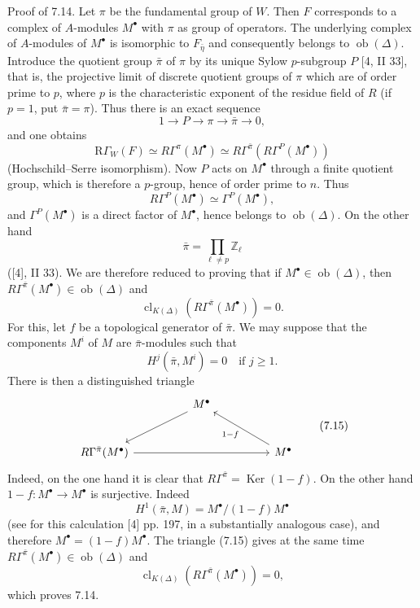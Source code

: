 \documentclass[11pt]{article}
\providecommand{\Ker}{\operatorname{Ker}}
\providecommand{\Ob}{\operatorname{ob}}
\providecommand{\Ker}{\operatorname{Ker}}
\providecommand{\Ker}{\operatorname{Ker}}
\providecommand{\Ob}{\operatorname{ob}}
\providecommand{\Ob}{\operatorname{Ob}}
\providecommand{\clK}[1]{\operatorname{cl}_{K(#1)}}
\providecommand{\RG}{\mathrm R\Gamma}
\providecommand{\Ob}{\operatorname{ob}}
\providecommand{\Ob}{\operatorname{Ob}}
\begin{document}
Proof of 7.14. Let $\pi$ be the fundamental group of $W$. Then $F$ corresponds to a complex of $A$-modules $M^\bullet$ with $\pi$ as group of operators. The underlying complex of $A$-modules of $M^\bullet$ is isomorphic to $F_{\bar\eta}$ and consequently belongs to $\Ob(\Delta)$. Introduce the quotient group $\bar\pi$ of $\pi$ by its unique Sylow $p$-subgroup $P$ [4, II 33], that is, the projective limit of discrete quotient groups of $\pi$ which are of order prime to $p$, where $p$ is the characteristic exponent of the residue field of $R$ (if $p=1$, put $\bar\pi=\pi$). Thus there is an exact sequence
\[
1\longrightarrow P\longrightarrow \pi\longrightarrow \bar\pi\longrightarrow0,
\]
and one obtains
\[
\RG_W(F)\simeq R\Gamma^\pi(M^\bullet)
\simeq R\Gamma^{\bar\pi}(R\Gamma^P(M^\bullet))
\]
(Hochschild--Serre isomorphism). Now $P$ acts on $M^\bullet$ through a finite quotient group, which is therefore a $p$-group, hence of order prime to $n$. Thus
\[
R\Gamma^P(M^\bullet)\simeq \Gamma^P(M^\bullet),
\]
and $\Gamma^P(M^\bullet)$ is a direct factor of $M^\bullet$, hence belongs to $\Ob(\Delta)$. On the other hand
\[
\bar\pi=\prod_{\ell\ne p}\mathbb Z_\ell
\]
([4], II 33). We are therefore reduced to proving that if $M^\bullet\in\Ob(\Delta)$, then $R\Gamma^{\bar\pi}(M^\bullet)\in\Ob(\Delta)$ and
\[
\clK{\Delta}(R\Gamma^{\bar\pi}(M^\bullet))=0.
\]
For this, let $f$ be a topological generator of $\bar\pi$. We may suppose that the components $M^i$ of $M$ are $\bar\pi$-modules such that
\[
H^j(\bar\pi,M^i)=0\quad\text{if }j\ge1.
\]
There is then a distinguished triangle
\[
\begin{tikzcd}[column sep=huge,row sep=large]
& M^\bullet \arrow[dl] &\\
R\Gamma^{\bar\pi}(M^\bullet) \arrow[rr] && M^\bullet \arrow[ul,"1-f"]
\end{tikzcd}
\tag{7.15}
\]
Indeed, on the one hand it is clear that $R\Gamma^{\bar\pi}=\Ker(1-f)$. On the other hand $1-f:M^\bullet\to M^\bullet$ is surjective. Indeed
\[
H^1(\bar\pi,M)=M^\bullet/(1-f)M^\bullet
\]
(see for this calculation [4] pp. 197, in a substantially analogous case), and therefore $M^\bullet=(1-f)M^\bullet$. The triangle (7.15) gives at the same time $R\Gamma^{\bar\pi}(M^\bullet)\in\Ob(\Delta)$ and
\[
\clK{\Delta}(R\Gamma^{\bar\pi}(M^\bullet))=0,
\]
which proves 7.14.
\end{document}
